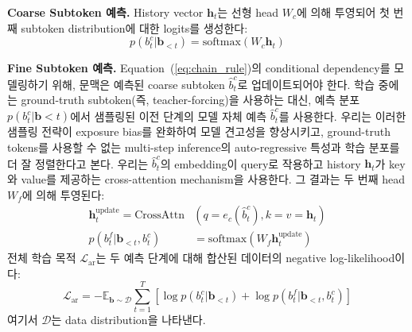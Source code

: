 \textbf{Coarse Subtoken 예측.} History vector $\mathbf{h}_t$는 선형 head $W_c$에 의해 투영되어 첫 번째 subtoken distribution에 대한 logits를 생성한다:
\begin{equation}
    p(b_{t}^{c} | \mathbf{b}_{< t}) = \text{softmax}(W_c \mathbf{h}_t)
\end{equation}

\textbf{Fine Subtoken 예측.} Equation~(\ref{eq:chain_rule})의 conditional dependency를 모델링하기 위해, 문맥은 예측된 coarse subtoken $\hat{b}_{t}^{c}$로 업데이트되어야 한다. 학습 중에는 ground-truth subtoken(즉, teacher-forcing)을 사용하는 대신, 예측 분포 $p(b_{t}^{c} | \mathbf{b}{< t})$에서 샘플링된 이전 단계의 모델 자체 예측 $\hat{b}_{t}^{c}$를 사용한다. 우리는 이러한 샘플링 전략이 exposure bias를 완화하여 모델 견고성을 향상시키고, ground-truth tokens를 사용할 수 없는 multi-step inference의 auto-regressive 특성과 학습 분포를 더 잘 정렬한다고 본다. 우리는 $\hat{b}_{t}^{c}$의 embedding이 query로 작용하고 history $\mathbf{h}_t$가 key와 value를 제공하는 cross-attention mechanism을 사용한다. 그 결과는 두 번째 head $W_f$에 의해 투영된다:
\begin{equation}
\begin{aligned}
    \mathbf{h}^{\text{update}}_t = \text{CrossAttn}&(q=e_c(\hat{b}_{t}^{c}), k=v=\mathbf{h}_t) \\
    p(b_{t}^{f} | \mathbf{b}_{< t}, b_{t}^{c}) &= \text{softmax}(W_f \mathbf{h}^{\text{update}}_t)
\end{aligned}
\end{equation}
전체 학습 목적 $\mathcal{L}_{\text{ar}}$는 두 예측 단계에 대해 합산된 데이터의 negative log-likelihood이다:
\begin{equation}
    \mathcal{L}_{\text{ar}} = - \mathbb{E}_{\mathbf{b} \sim \mathcal{D}} \sum_{t=1}^{T} \left[ \log p(b_t^{c} | \mathbf{b}_{<t}) + \log p(b_t^{f} | \mathbf{b}_{<t}, b_t^{c}) \right]
\end{equation}
여기서 $\mathcal{D}$는 data distribution을 나타낸다.

\begin{table}[t]
\centering
\setlength{\tabcolsep}{4pt}

\caption{Kronos family의 model configurations. Transformer layers 수, model dimension ($\mathbf{d}_{\text{model}}$), feed-forward dimension ($\mathbf{d}_{\text{ff}}$), attention heads 수, vocabulary size, 그리고 총 parameters 수를 상세히 제시한다.}
\label{tab:kronos_configs_resized}
\end{table}


